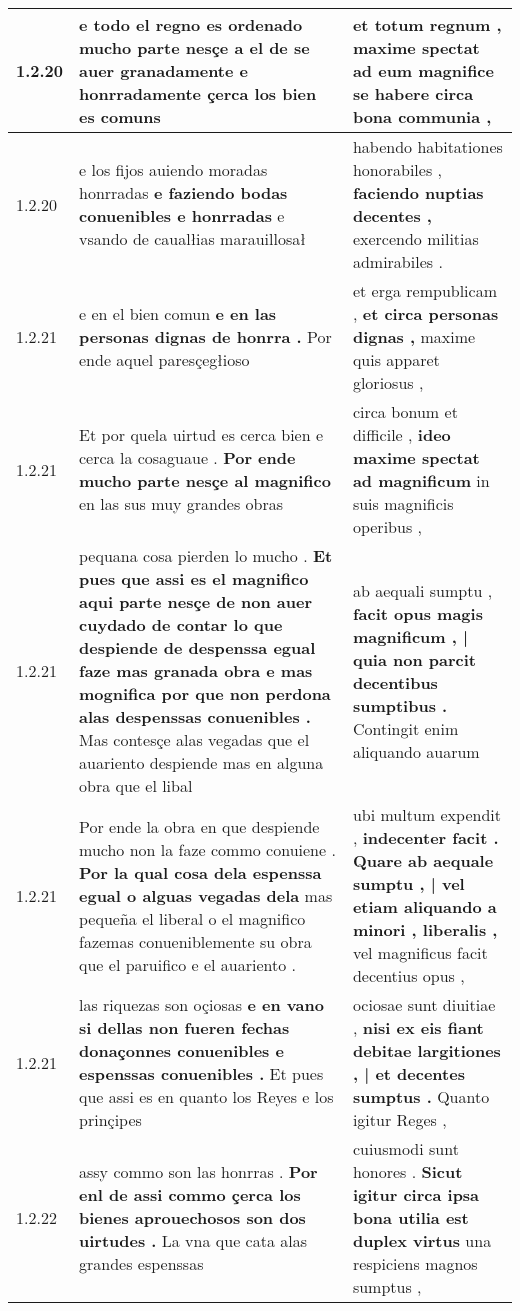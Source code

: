 \begin{tabular}{|p{1cm}|p{6.5cm}|p{6.5cm}|}
1.2.20 & e todo el regno es ordenado \textbf{ mucho parte nesçe a el de se auer granadamente } e honrradamente çerca los bien es comuns & et totum regnum , \textbf{ maxime spectat ad eum magnifice } se habere circa bona communia , \\\hline
1.2.20 & e los fijos auiendo moradas honrradas \textbf{ e faziendo bodas conuenibles e honrradas } e vsando de caualłias marauillosał & habendo habitationes honorabiles , \textbf{ faciendo nuptias decentes , } exercendo militias admirabiles . \\\hline
1.2.21 & e en el bien comun \textbf{ e en las personas dignas de honrra . } Por ende aquel paresçegłioso & et erga rempublicam , \textbf{ et circa personas dignas , } maxime quis apparet gloriosus , \\\hline
1.2.21 & Et por quela uirtud es cerca bien e cerca la cosaguaue . \textbf{ Por ende mucho parte nesçe al magnifico } en las sus muy grandes obras & circa bonum et difficile , \textbf{ ideo maxime spectat ad magnificum } in suis magnificis operibus , \\\hline
1.2.21 & pequana cosa pierden lo mucho . \textbf{ Et pues que assi es el magnifico aqui parte nesçe de non auer cuydado de contar lo que despiende de despenssa egual faze mas granada obra e mas mognifica por que non perdona alas despenssas conuenibles . } Mas contesçe alas vegadas que el auariento despiende mas en alguna obra que el libal & ab aequali sumptu , \textbf{ facit opus magis magnificum , | quia non parcit decentibus sumptibus . } Contingit enim aliquando auarum \\\hline
1.2.21 & Por ende la obra en que despiende mucho non la faze commo conuiene . \textbf{ Por la qual cosa dela espenssa egual o alguas vegadas dela } mas pequeña el liberal o el magnifico fazemas conueniblemente su obra que el paruifico e el auariento . & ubi multum expendit , \textbf{ indecenter facit . Quare ab aequale sumptu , | vel etiam aliquando a minori , liberalis , } vel magnificus facit decentius opus , \\\hline
1.2.21 & las riquezas son oçiosas \textbf{ e en vano si dellas non fueren fechas donaçonnes conuenibles e espenssas conuenibles . } Et pues que assi es en quanto los Reyes e los prinçipes & ociosae sunt diuitiae , \textbf{ nisi ex eis fiant debitae largitiones , | et decentes sumptus . } Quanto igitur Reges , \\\hline
1.2.22 & assy commo son las honrras . \textbf{ Por enl de assi commo çerca los bienes aprouechosos son dos uirtudes . } La vna que cata alas grandes espenssas & cuiusmodi sunt honores . \textbf{ Sicut igitur circa ipsa bona utilia est duplex virtus } una respiciens magnos sumptus , \\\hline

\end{tabular}
